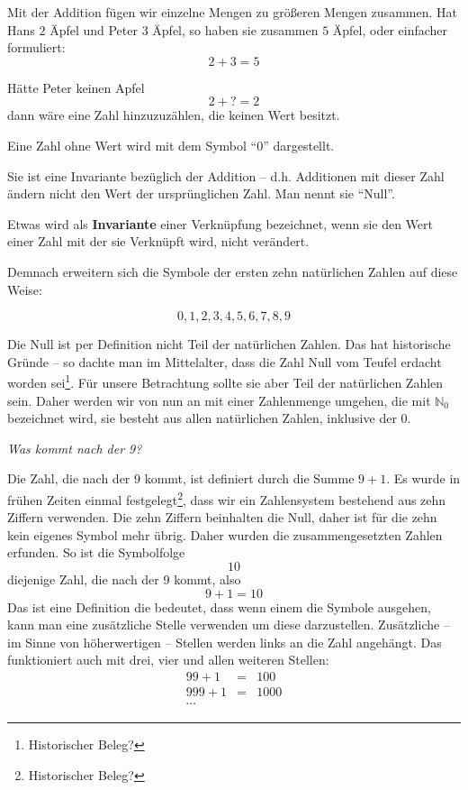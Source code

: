 Mit der Addition fügen wir einzelne Mengen zu größeren Mengen zusammen. Hat Hans $2$ Äpfel und Peter $3$ Äpfel, so haben sie zusammen $5$ Äpfel, oder einfacher formuliert:
\[
2+3=5
\]

\noindent Hätte Peter keinen Apfel
\[2+?=2\]
dann wäre eine Zahl hinzuzuzählen, die keinen Wert besitzt. 
\begin{definition}
Eine Zahl ohne Wert wird mit dem Symbol "`0"' dargestellt.
\end{definition}

Sie ist eine Invariante bezüglich der Addition -- d.h. Additionen mit dieser Zahl ändern nicht den Wert der ursprünglichen Zahl. Man nennt sie "`Null"'. 

\begin{definition}
Etwas wird als \textbf{Invariante} einer Verknüpfung bezeichnet, wenn sie den Wert einer Zahl mit der sie Verknüpft wird, nicht verändert.
\end{definition}

Demnach erweitern sich die Symbole der ersten zehn natürlichen Zahlen auf diese Weise:

\[0,1,2,3,4,5,6,7,8,9\]

Die Null ist per Definition nicht Teil der natürlichen Zahlen. Das hat historische Gründe -- so dachte man im Mittelalter, dass die Zahl Null vom Teufel erdacht worden sei\footnote{Historischer Beleg?}. Für unsere Betrachtung sollte sie aber Teil der natürlichen Zahlen sein. Daher werden wir von nun an mit einer Zahlenmenge umgehen, die mit $\mathbb{N}_0$ bezeichnet wird, sie besteht aus allen natürlichen Zahlen, inklusive der 0.

\textsl{Was kommt nach der 9?}

Die Zahl, die nach der 9 kommt, ist definiert durch die Summe $9+1$. Es wurde in frühen Zeiten einmal festgelegt\footnote{Historischer Beleg?}, dass wir ein Zahlensystem bestehend aus zehn Ziffern verwenden. Die zehn Ziffern beinhalten die Null, daher ist für die zehn kein eigenes Symbol mehr übrig. Daher wurden die zusammengesetzten Zahlen erfunden. So ist die Symbolfolge
\[10\]
diejenige Zahl, die nach der 9 kommt, also
\[9+1=10\]
Das ist eine Definition die bedeutet, dass wenn einem die Symbole ausgehen, kann man eine zusätzliche Stelle verwenden um diese darzustellen. Zusätzliche -- im Sinne von höherwertigen -- Stellen werden links an die Zahl angehängt. Das funktioniert auch mit drei, vier und allen weiteren Stellen:
\begin{eqnarray*}
99+1 &=& 100 \\
999+1 &=& 1000 \\
\cdots
\end{eqnarray*}

